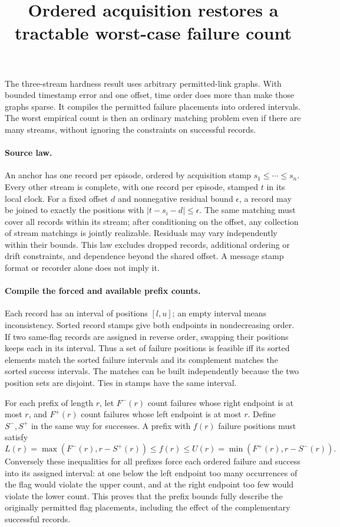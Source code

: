\documentclass[11pt]{article}
\title{Ordered acquisition restores a tractable worst-case failure count}
\begin{document}
\maketitle

The three-stream hardness result uses arbitrary permitted-link graphs.
With bounded timestamp error and one offset, time order does more than
make those graphs sparse. It compiles the permitted failure placements
into ordered intervals. The worst empirical count is then an ordinary
matching problem even if there are many streams, without ignoring the
constraints on successful records.

\paragraph{Source law.}
An anchor has one record per episode, ordered by acquisition stamp
\(s_1\le\cdots\le s_n\). Every other stream is complete, with one
record per episode, stamped \(t\) in its local clock. For a fixed
offset \(d\) and nonnegative residual bound \(\epsilon\), a record
may be joined to exactly the positions with \(|t-s_i-d|\le\epsilon\).
The same matching must cover all records within its stream; after
conditioning on the offset, any collection of stream matchings
is jointly realizable. Residuals may vary independently within
their bounds. This law excludes dropped records, additional
ordering or drift constraints, and dependence beyond the shared
offset. A message stamp format or recorder alone does not imply it.

\paragraph{Compile the forced and available prefix counts.}
Each record has an interval of positions \([l,u]\); an empty
interval means inconsistency. Sorted record stamps give both
endpoints in nondecreasing order. If two same-flag records are
assigned in reverse order, swapping their positions keeps each
in its interval. Thus a set of failure positions is feasible iff
its sorted elements match the sorted failure intervals and its
complement matches the sorted success intervals. The matches
can be built independently because the two position sets are
disjoint. Ties in stamps have the same interval.

For each prefix of length \(r\), let \(F^-(r)\) count failures
whose right endpoint is at most \(r\), and \(F^+(r)\) count failures
whose left endpoint is at most \(r\). Define \(S^-,S^+\) in the same
way for successes. A prefix with \(f(r)\) failure positions must satisfy
\[
 L(r)=\max(F^-(r),r-S^+(r))\le f(r)\le
 U(r)=\min(F^+(r),r-S^-(r)).
\]
Conversely these inequalities for all prefixes force each ordered
failure and success into its assigned interval: at one below the
left endpoint too many occurrences of the flag would violate the
upper count, and at the right endpoint too few would violate the
lower count. This proves that the prefix bounds fully describe
the originally permitted flag placements, including the effect
of the complementary successful records.
\end{document}
